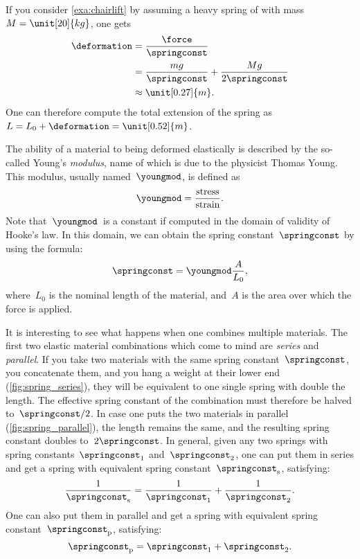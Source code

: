 \begin{example}
    If you consider \cref{exa:chairlift} by assuming a heavy spring of with mass~$M=\unit[20]{kg}$, one gets
    \begin{equation}
        \begin{aligned}
            \deformation & =\frac{\force}{\springconst} \\
            & =\frac{mg}{\springconst}+\frac{Mg}{2\springconst} \\
            & \approx \unit[0.27]{m}.
        \end{aligned}
    \end{equation}
    One can therefore compute the total extension of the spring as~$L=L_0+\deformation=\unit[0.52]{m}$.
\end{example}

The ability of a material to being deformed elastically is described by the so-called Young's \emph{modulus}, name of which is due to the physicist Thomas Young.
This modulus, usually named~$\youngmod$, is defined as
\begin{equation}
    \youngmod=\frac{\text{stress}}{\text{strain}}.
\end{equation}
Note that~$\youngmod$~is a constant if computed in the domain of validity of Hooke's law.
In this domain, we can obtain the spring constant~$\springconst$ by using the formula:
\begin{equation}
    \springconst=\youngmod \frac{A}{L_0},
\end{equation}
where~$L_0$ is the nominal length of the material, and~$A$ is the area over which the force is applied.

It is interesting to see what happens when one combines multiple materials.
The first two elastic material combinations which come to mind are \emph{series} and \emph{parallel}.
If you take two materials with the same spring constant~$\springconst$, you concatenate them, and you hang a weight at their lower end (\cref{fig:spring_series}), they will be equivalent to one single spring with double the length.
The effective spring constant of the combination must therefore be halved to~$\springconst/2$.
In case one puts the two materials in parallel (\cref{fig:spring_parallel}), the length remains the same, and the resulting spring constant doubles to~$2\springconst$.
In general, given any two springs with spring constants~$\springconst_1$ and~$\springconst_2$, one can put them in series and get a spring with equivalent spring constant~$\springconst_{\mathrm{s}}$, satisfying:
\begin{equation}
    \frac{1}{\springconst_\mathrm{s}}=\frac{1}{\springconst_1}+\frac{1}{\springconst_2}.
\end{equation}
One can also put them in parallel and get a spring with equivalent spring constant~$\springconst_\mathrm{p}$, satisfying:
\begin{equation}
    \springconst_\mathrm{p}=\springconst_1+\springconst_2.
\end{equation}

